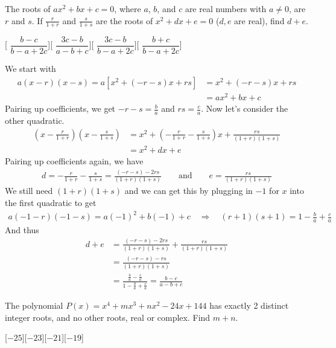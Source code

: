 \begin{problem}
    The roots of \( ax^2 + bx + c = 0 \), where \( a \), \( b \), and \( c \) are real numbers with \( a \neq 0 \), are \( r \) and \( s \). If \( \frac{r}{1+r} \) and \( \frac{s}{1+s} \) are the roots of \( x^2 + dx + e = 0 \) (\( d, e \) are real), find \( d + e \).
\end{problem}
[
    $\dfrac{b-c}{b-a+2c}$][
    $\dfrac{3c-b}{a-b+c}$][
    $\dfrac{3c-b}{b-a+2c}$][
    $\dfrac{b+c}{b-a+2c}$]

\begin{solution}[A]
    We start with
    \begin{align*}
          a(x-r)(x-s) = a[x^2+(-r-s)x+rs] &= x^2+(-r-s)x+rs\\
          &= ax^2+bx+c
    \end{align*}
    Pairing up coefficients, we get \(-r-s=\frac{b}{a}\) and \(rs=\frac{c}{a}\). Now let's consider the other quadratic.
    \begin{align*}
        \left(x-\frac{r}{1+r}\right)\left(x-\frac{s}{1+s}\right) &= x^2 + \left(-\frac{r}{1+r}-\frac{s}{1+s}\right)x + \frac{rs}{(1+r)(1+s)}\\
        &= x^2 + dx + e
    \end{align*}
    Pairing up coefficients again, we have
    \begin{align*}
        d = -\frac{r}{1+r}-\frac{s}{1+s} = \frac{(-r-s)-2rs}{(1+r)(1+s)} \qquad \text{and} \qquad e= \frac{rs}{(1+r)(1+s)}
    \end{align*}
    We still need \((1+r)(1+s)\) and we can get this by plugging in $-1$ for $x$ into the first quadratic to get
    \begin{align*}
        a(-1-r)(-1-s) = a(-1)^2+b(-1)+c \quad \Rightarrow \quad (r+1)(s+1) = 1 - \frac{b}{a} + \frac{c}{a}
    \end{align*}
    And thus
    \begin{align*}
        d+e &= \frac{(-r-s)-2rs}{(1+r)(1+s)} + \frac{rs}{(1+r)(1+s)}\\
        &= \frac{(-r-s)-rs}{(1+r)(1+s)}\\
        &= \frac{\frac{b}{a}-\frac{c}{a}}{1-\frac{b}{a}+\frac{c}{a}} = \boxed{\frac{b-c}{a-b+c}}
    \end{align*}
\end{solution}

\begin{problem}
   The polynomial \( P(x) = x^4 + mx^3 + nx^2 - 24x + 144 \) has exactly 2 distinct integer roots, and no other roots, real or complex. Find \( m + n \).
   \end{problem}
[$-25$][$-23$][$-21$][$-19$]

